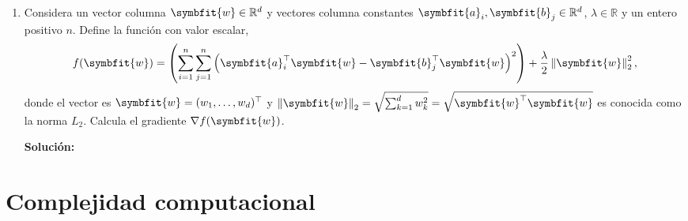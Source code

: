 \documentclass[11pt,letterpaper]{article}
\newenvironment{solution}{%
  \noindent\begin{shaded}
  \textbf{Solución:}\ }{
  \end{shaded}%
}
\newcommand{\bvec}[1]{\symbfit{#1}}
\newcommand{\norm}[1]{\left\lVert#1\right\rVert}
\begin{document}
\begin{enumerate}
\item%
  Considera un vector columna \(\bvec{w}\in\mathbb{R}^d\) y vectores
  columna constantes \(\bvec{a}_i,\bvec{b}_j\in\mathbb{R}^d\),
  \(\lambda\in\mathbb{R}\) y un entero positivo \(n\).  Define la
  función con valor escalar,
  \[ f(\bvec{w})=\left(\sum_{i=1}^n\sum_{j=1}^n\left(\bvec{a}_i^\top\bvec{w}-\bvec{b}_j^\top\bvec{w}\right)^2\right)+\frac{\lambda}{2}\norm{\bvec{w}}_2^2, \]
  donde el vector es \(\bvec{w} = (w_1,\dots,w_d)^\top\) y
  \(\norm{\bvec{w}}_2 = \sqrt{\sum_{k=1}^d w_k^2} =
  \sqrt{\bvec{w}^\top\bvec{w}}\) es conocida como la norma \(L_2\).
  Calcula el gradiente \(\nabla f(\bvec{w})\).
  \begin{solution}
  \end{solution}
\end{enumerate}

\newpage

\section*{Complejidad computacional}
\end{document}

